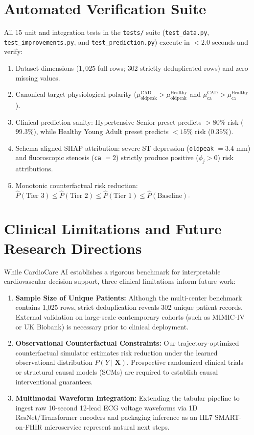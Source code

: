 \documentclass[12pt,a4paper]{report}
\begin{document}
\section{Automated Verification Suite}
All 15 unit and integration tests in the \texttt{tests/} suite (\texttt{test\_data.py}, \texttt{test\_improvements.py}, and \texttt{test\_prediction.py}) execute in $<2.0$ seconds and verify:
\begin{enumerate}
    \item Dataset dimensions ($1,025$ full rows; $302$ strictly deduplicated rows) and zero missing values.
    \item Canonical target physiological polarity ($\bar{\mu}_{\text{oldpeak}}^{\text{CAD}} > \bar{\mu}_{\text{oldpeak}}^{\text{Healthy}}$ and $\bar{\mu}_{\text{ca}}^{\text{CAD}} > \bar{\mu}_{\text{ca}}^{\text{Healthy}}$).
    \item Clinical prediction sanity: Hypertensive Senior preset predicts $>80\%$ risk ($99.3\%$), while Healthy Young Adult preset predicts $<15\%$ risk ($0.35\%$).
    \item Schema-aligned SHAP attribution: severe ST depression (\texttt{oldpeak} $= 3.4\text{ mm}$) and fluoroscopic stenosis (\texttt{ca} $= 2$) strictly produce positive ($\phi_j > 0$) risk attributions.
    \item Monotonic counterfactual risk reduction: $\hat{P}(\text{Tier 3}) \le \hat{P}(\text{Tier 2}) \le \hat{P}(\text{Tier 1}) \le \hat{P}(\text{Baseline})$.
\end{enumerate}

\section{Clinical Limitations and Future Research Directions}
While CardioCare AI establishes a rigorous benchmark for interpretable cardiovascular decision support, three clinical limitations inform future work:
\begin{enumerate}
    \item \textbf{Sample Size of Unique Patients:} Although the multi-center benchmark contains 1,025 rows, strict deduplication reveals 302 unique patient records. External validation on large-scale contemporary cohorts (such as MIMIC-IV or UK Biobank) is necessary prior to clinical deployment.
    \item \textbf{Observational Counterfactual Constraints:} Our trajectory-optimized counterfactual simulator estimates risk reduction under the learned observational distribution $P(Y \mid \bm{X})$. Prospective randomized clinical trials or structural causal models (SCMs) are required to establish causal interventional guarantees.
    \item \textbf{Multimodal Waveform Integration:} Extending the tabular pipeline to ingest raw 10-second 12-lead ECG voltage waveforms via 1D ResNet/Transformer encoders and packaging inference as an HL7 SMART-on-FHIR microservice represent natural next steps.
\end{enumerate}
\end{document}
